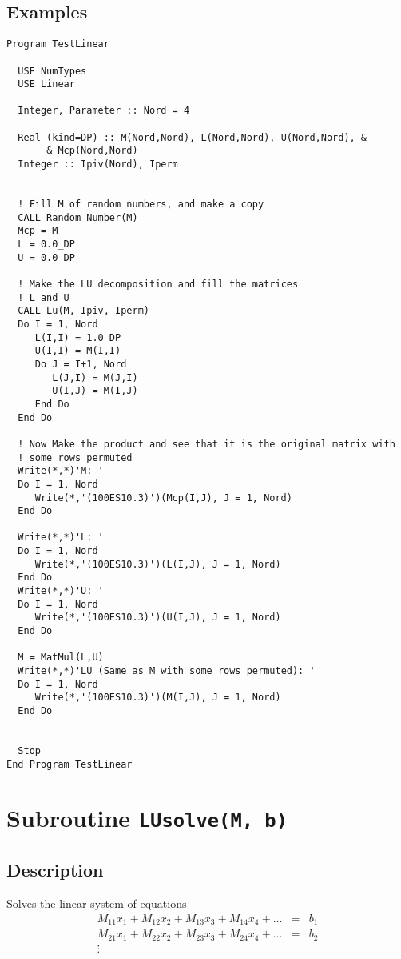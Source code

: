 \subsection{Examples}

\begin{lstlisting}[emph=LU,
                   emphstyle=\color{blue},
                   frame=trBL,
                   caption=Making the LU decomposition.,
                   label=lu]
Program TestLinear

  USE NumTypes
  USE Linear

  Integer, Parameter :: Nord = 4

  Real (kind=DP) :: M(Nord,Nord), L(Nord,Nord), U(Nord,Nord), &
       & Mcp(Nord,Nord)
  Integer :: Ipiv(Nord), Iperm

  
  ! Fill M of random numbers, and make a copy
  CALL Random_Number(M)
  Mcp = M
  L = 0.0_DP
  U = 0.0_DP

  ! Make the LU decomposition and fill the matrices 
  ! L and U
  CALL Lu(M, Ipiv, Iperm)
  Do I = 1, Nord
     L(I,I) = 1.0_DP
     U(I,I) = M(I,I)
     Do J = I+1, Nord
        L(J,I) = M(J,I)
        U(I,J) = M(I,J)
     End Do
  End Do

  ! Now Make the product and see that it is the original matrix with
  ! some rows permuted
  Write(*,*)'M: '
  Do I = 1, Nord
     Write(*,'(100ES10.3)')(Mcp(I,J), J = 1, Nord)
  End Do

  Write(*,*)'L: '
  Do I = 1, Nord
     Write(*,'(100ES10.3)')(L(I,J), J = 1, Nord)
  End Do
  Write(*,*)'U: '
  Do I = 1, Nord
     Write(*,'(100ES10.3)')(U(I,J), J = 1, Nord)
  End Do

  M = MatMul(L,U)
  Write(*,*)'LU (Same as M with some rows permuted): '
  Do I = 1, Nord
     Write(*,'(100ES10.3)')(M(I,J), J = 1, Nord)
  End Do


  Stop
End Program TestLinear
\end{lstlisting}

\section{Subroutine \texttt{LUsolve(M, b)}}

\subsection{Description}
Solves the linear system of equations
\begin{eqnarray}
  M_{11}x_1 + M_{12}x_2 + M_{13}x_3 + M_{14}x_4 + \dots & = & b_1 \\
  \nonumber
  M_{21}x_1 + M_{22}x_2 + M_{23}x_3 + M_{24}x_4 + \dots & = & b_2 \\
  \nonumber
  \vdots & & 
\end{eqnarray}

